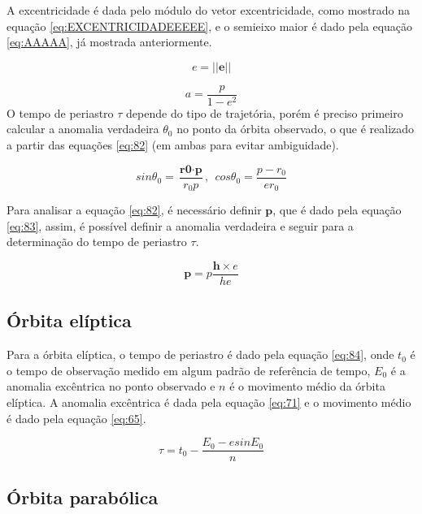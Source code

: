 A excentricidade é dada pelo módulo do vetor excentricidade, como mostrado na equação \ref{eq:EXCENTRICIDADEEEEE}, e o semieixo maior é dado pela equação \ref{eq:AAAAA}, já mostrada anteriormente.

\begin{equation}
    e = \left|\left| \textbf{e} \right|\right|
    \label{eq:EXCENTRICIDADEEEEE}
\end{equation}

\begin{equation}
    a = \frac{p}{1-e^{2}}
    \label{eq:AAAAA}
\end{equation}
O tempo de periastro $\tau$ depende do tipo de trajetória, porém é preciso primeiro calcular a anomalia verdadeira $\theta_{0}$ no ponto da órbita observado, o que é realizado a partir das equações \ref{eq:82} (em ambas para evitar ambiguidade).

\begin{equation}
    sin \theta_{0} = \frac{\textbf{r0} \cdot \textbf{p}}{r_{0}p}, \ \ cos \theta_{0} = \frac{p-r_{0}}{er_{0}}
    \label{eq:82}
\end{equation}

Para analisar a equação \ref{eq:82}, é necessário definir $\textbf{p}$, que é dado pela equação \ref{eq:83}, assim, é possível definir a anomalia verdadeira e seguir para a determinação do tempo de periastro $\tau$.

\begin{equation}
\textbf{p} = p\frac{\textbf{h} \times e} {he}
    \label{eq:83}
\end{equation}

\subsection{Órbita elíptica}
Para a órbita elíptica, o tempo de periastro é dado pela equação \ref{eq:84}, onde $t_{0}$ é o tempo de observação medido em algum padrão de referência de tempo, $E_{0}$ é a anomalia excêntrica no ponto observado e $n$ é o movimento médio da órbita elíptica. A anomalia excêntrica é dada pela equação \ref{eq:71} e o movimento médio é dado pela equação \ref{eq:65}.

\begin{equation}
    \tau = t_{0}-\frac{E_{0} - esinE_{0}}{n}
    \label{eq:84}
\end{equation}

\subsection{Órbita parabólica}

